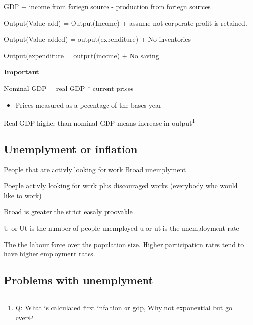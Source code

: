\documentclass[twocolumn]{article}
\providecommand{\tightlist}{%
  \setlength{\itemsep}{0pt}\setlength{\parskip}{0pt}}
\begin{document}
GDP + income from foriegn source - production from foriegn sources

Output(Value add) = Output(Income) + assume not corporate profit is
retained.

Output(Value added) = output(expenditure) + No inventories

Output(expenditure = output(income) + No saving

\textbf{Important}

\begin{description}
\tightlist
\item[Nominal vs real GDP]
Nominal GDP = real GDP * current prices
\end{description}

\begin{itemize}
\tightlist
\item
  Prices measured as a pecentage of the bases year
\end{itemize}

Real GDP higher than nominal GDP means increase in output\footnote{Q:
  What is calculated first infaltion or gdp, Why not exponential but go
  over}

\hypertarget{unemplyment-or-inflation}{%
\subsection{Unemplyment or inflation}\label{unemplyment-or-inflation}}

\begin{description}
\tightlist
\item[Strict unemployment]
People that are activly looking for work Broad unemplyment

Poeple activly looking for work plus discouraged works (everybody who
would like to work)
\end{description}

Broad is greater the strict easaly proovable

U or Ut is the number of people unemployed u or ut is the unemployment
rate

\begin{description}
\tightlist
\item[Paticipation rate]
The the labour force over the population size. Higher participation
rates tend to have higher employment rates.
\end{description}

\hypertarget{problems-with-unemplyment}{%
\subsection{Problems with unemplyment}\label{problems-with-unemplyment}}
\end{document}
